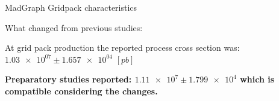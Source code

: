 \documentclass[8pt]{beamer}
\begin{document}
\begin{frame}{MadGraph Gridpack characteristics}
\begin{block}{What changed from previous studies:}
\end{block}

\begin{block}
  
\begin{center}
At grid pack production the reported process cross section was: 
$\num{1.03e+07} \pm \num{1.657e+04}$ $[pb]$
\end{center}

\begin{center}
\textbf{Preparatory studies reported: $\num{1.11e7} \pm \num{1.799e4}$ which is compatible considering the changes.}
\end{center}

\end{block}

\end{frame}
\end{document}
